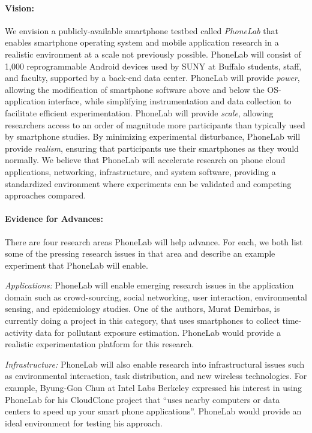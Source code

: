 \documentclass[12pt]{article}
\begin{document}
\paragraph{Vision:} We envision a publicly-available smartphone testbed called
\emph{PhoneLab} that enables smartphone operating system and mobile
application research in a realistic environment at a scale not previously
possible. PhoneLab will consist of 1,000 reprogrammable Android devices
used by SUNY at Buffalo students, staff, and faculty, supported by a back-end
data center. PhoneLab will provide \emph{power}, allowing the modification of
smartphone software above and below the OS-application interface, while
simplifying instrumentation and data collection to facilitate efficient
experimentation. PhoneLab will provide \emph{scale}, allowing researchers
access to an order of magnitude more participants than typically used
by smartphone studies. By minimizing experimental disturbance, PhoneLab will
provide \emph{realism}, ensuring that participants use their smartphones
as they would normally. We believe that PhoneLab will accelerate research
on phone cloud applications, networking, infrastructure, and system software,
providing a standardized environment where experiments can be validated and
competing approaches compared.

\paragraph{Evidence for Advances:} There are four research areas
PhoneLab will help advance. For each, we both list some of the pressing
research issues in that area and describe an example experiment that
PhoneLab will enable.

\emph{Applications:} PhoneLab will enable emerging research issues in the
application domain such as crowd-sourcing, social networking, user interaction,
environmental sensing, and epidemiology studies. One of the authors, Murat
Demirbas, is currently doing a project in this category, that uses smartphones
to collect time-activity data for pollutant exposure estimation. PhoneLab
would provide a realistic experimentation platform for this research.

\emph{Infrastructure:} PhoneLab will also enable research into infrastructural
issues such as environmental interaction, task distribution, and new wireless
technologies. For example, Byung-Gon Chun at Intel Labs Berkeley expressed
his interest in using PhoneLab for his CloudClone project that
``uses nearby computers or data centers to speed up your smart phone
applications''. PhoneLab would provide an ideal environment for testing
his approach.
\end{document}
